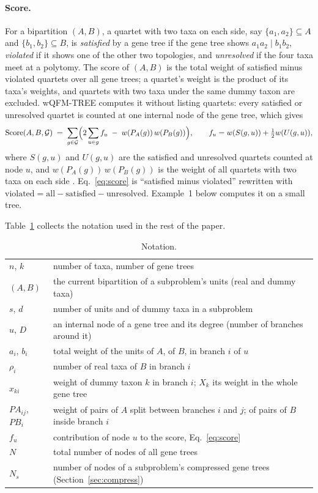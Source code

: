 \documentclass[11pt,a4paper]{article}
\newcommand{\wqfmtree}{wQFM-TREE}
\begin{document}
\paragraph{Score.} For a bipartition $(A,B)$, a quartet with two taxa on each side, say
$\{a_1,a_2\}\subseteq A$ and $\{b_1,b_2\}\subseteq B$, is \emph{satisfied} by a gene tree if the
gene tree shows $a_1a_2\mid b_1b_2$, \emph{violated} if it shows one of the other two topologies,
and \emph{unresolved} if the four taxa meet at a polytomy. The score of $(A,B)$ is the total weight
of satisfied minus violated quartets over all gene trees; a quartet's weight is the product of its
taxa's weights, and quartets with two taxa under the same dummy taxon are excluded. \wqfmtree{}
computes it without listing quartets: every satisfied or unresolved quartet is counted at one
internal node of the gene tree, which gives
\begin{equation}\label{eq:score}
  \mathrm{Score}(A,B,\mathcal{G}) \;=\; \sum_{g\in\mathcal{G}}
  \Bigl( 2\sum_{u\in g} f_u \;-\; w(P_A(g))\,w(P_B(g)) \Bigr),
  \qquad f_u = w(S(g,u)) + \tfrac12 w(U(g,u)),
\end{equation}
where $S(g,u)$ and $U(g,u)$ are the satisfied and unresolved quartets counted at node $u$, and
$w(P_A(g))\,w(P_B(g))$ is the weight of all quartets with two taxa on each side
\citep{rafi2025wqfmtree}. Eq.~\eqref{eq:score} is ``satisfied minus violated'' rewritten with
$\text{violated}=\text{all}-\text{satisfied}-\text{unresolved}$. Example~1 below computes it on a
small tree.

Table~\ref{tab:notation} collects the notation used in the rest of the paper.

\begin{table}[t]
\centering\small
\caption{Notation.}
\label{tab:notation}
\begin{tabular}{@{}ll@{}}
\toprule
$n$, $k$ & number of taxa, number of gene trees \\
$(A,B)$ & the current bipartition of a subproblem's units (real and dummy taxa) \\
$s$, $d$ & number of units and of dummy taxa in a subproblem \\
$u$, $D$ & an internal node of a gene tree and its degree (number of branches around it) \\
$a_i$, $b_i$ & total weight of the units of $A$, of $B$, in branch $i$ of $u$ \\
$\rho_i$ & number of real taxa of $B$ in branch $i$ \\
$x_{ki}$ & weight of dummy taxon $k$ in branch $i$; $X_k$ its weight in the whole gene tree \\
$PA_{ij}$, $PB_i$ & weight of pairs of $A$ split between branches $i$ and $j$; of pairs of $B$ inside branch $i$ \\
$f_u$ & contribution of node $u$ to the score, Eq.~\eqref{eq:score} \\
$N$ & total number of nodes of all gene trees \\
$N_s$ & number of nodes of a subproblem's compressed gene trees (Section~\ref{sec:compress}) \\
\bottomrule
\end{tabular}
\end{table}
\end{document}
